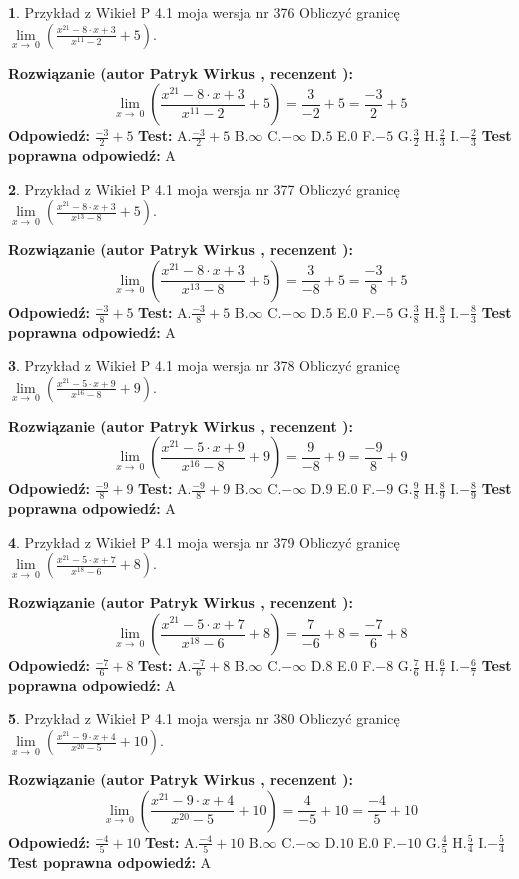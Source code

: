 \documentclass[12pt, a4paper]{article}
\theoremstyle{definition} %
\newtheorem{zad}{}
\newcommand{\zadStart}[1]{\begin{zad}#1\newline}
\newcommand{\zadStop}{\end{zad}}
\newcommand{\rozwStart}[2]{\noindent \textbf{Rozwiązanie (autor #1 , recenzent #2): }\newline}
\newcommand{\rozwStop}{\newline}
\newcommand{\odpStart}{\noindent \textbf{Odpowiedź:}\newline}
\newcommand{\odpStop}{\newline}
\newcommand{\testStart}{\noindent \textbf{Test:}\newline}
\newcommand{\testStop}{\newline}
\newcommand{\kluczStart}{\noindent \textbf{Test poprawna odpowiedź:}\newline}
\newcommand{\kluczStop}{\newline}
\begin{document}
\zadStart{Przykład z Wikieł P 4.1 moja wersja nr 376}
Obliczyć granicę $\lim\limits_{x\to\ 0}(\frac{x^{21}-8 \cdot x +3}{x^{11}-2}+5)$.
\zadStop
\rozwStart{Patryk Wirkus}{}
$$\lim\limits_{x\to\ 0}(\frac{x^{21}-8 \cdot x +3}{x^{11}-2}+5)=\frac{3}{-2}+5=\frac{-3}{2}+5$$
\rozwStop
\odpStart
$\frac{-3}{2}+5$
\odpStop
\testStart
A.$\frac{-3}{2}+5$
B.$\infty$
C.$-\infty$
D.$5$
E.$0$
F.$-5$
G.$\frac{3}{2}$
H.$\frac{2}{3}$
I.$-\frac{2}{3}$
\testStop
\kluczStart
A
\kluczStop



\zadStart{Przykład z Wikieł P 4.1 moja wersja nr 377}
Obliczyć granicę $\lim\limits_{x\to\ 0}(\frac{x^{21}-8 \cdot x +3}{x^{13}-8}+5)$.
\zadStop
\rozwStart{Patryk Wirkus}{}
$$\lim\limits_{x\to\ 0}(\frac{x^{21}-8 \cdot x +3}{x^{13}-8}+5)=\frac{3}{-8}+5=\frac{-3}{8}+5$$
\rozwStop
\odpStart
$\frac{-3}{8}+5$
\odpStop
\testStart
A.$\frac{-3}{8}+5$
B.$\infty$
C.$-\infty$
D.$5$
E.$0$
F.$-5$
G.$\frac{3}{8}$
H.$\frac{8}{3}$
I.$-\frac{8}{3}$
\testStop
\kluczStart
A
\kluczStop



\zadStart{Przykład z Wikieł P 4.1 moja wersja nr 378}
Obliczyć granicę $\lim\limits_{x\to\ 0}(\frac{x^{21}-5 \cdot x +9}{x^{16}-8}+9)$.
\zadStop
\rozwStart{Patryk Wirkus}{}
$$\lim\limits_{x\to\ 0}(\frac{x^{21}-5 \cdot x +9}{x^{16}-8}+9)=\frac{9}{-8}+9=\frac{-9}{8}+9$$
\rozwStop
\odpStart
$\frac{-9}{8}+9$
\odpStop
\testStart
A.$\frac{-9}{8}+9$
B.$\infty$
C.$-\infty$
D.$9$
E.$0$
F.$-9$
G.$\frac{9}{8}$
H.$\frac{8}{9}$
I.$-\frac{8}{9}$
\testStop
\kluczStart
A
\kluczStop



\zadStart{Przykład z Wikieł P 4.1 moja wersja nr 379}
Obliczyć granicę $\lim\limits_{x\to\ 0}(\frac{x^{21}-5 \cdot x +7}{x^{18}-6}+8)$.
\zadStop
\rozwStart{Patryk Wirkus}{}
$$\lim\limits_{x\to\ 0}(\frac{x^{21}-5 \cdot x +7}{x^{18}-6}+8)=\frac{7}{-6}+8=\frac{-7}{6}+8$$
\rozwStop
\odpStart
$\frac{-7}{6}+8$
\odpStop
\testStart
A.$\frac{-7}{6}+8$
B.$\infty$
C.$-\infty$
D.$8$
E.$0$
F.$-8$
G.$\frac{7}{6}$
H.$\frac{6}{7}$
I.$-\frac{6}{7}$
\testStop
\kluczStart
A
\kluczStop



\zadStart{Przykład z Wikieł P 4.1 moja wersja nr 380}
Obliczyć granicę $\lim\limits_{x\to\ 0}(\frac{x^{21}-9 \cdot x +4}{x^{20}-5}+10)$.
\zadStop
\rozwStart{Patryk Wirkus}{}
$$\lim\limits_{x\to\ 0}(\frac{x^{21}-9 \cdot x +4}{x^{20}-5}+10)=\frac{4}{-5}+10=\frac{-4}{5}+10$$
\rozwStop
\odpStart
$\frac{-4}{5}+10$
\odpStop
\testStart
A.$\frac{-4}{5}+10$
B.$\infty$
C.$-\infty$
D.$10$
E.$0$
F.$-10$
G.$\frac{4}{5}$
H.$\frac{5}{4}$
I.$-\frac{5}{4}$
\testStop
\kluczStart
A
\kluczStop
\end{document}
